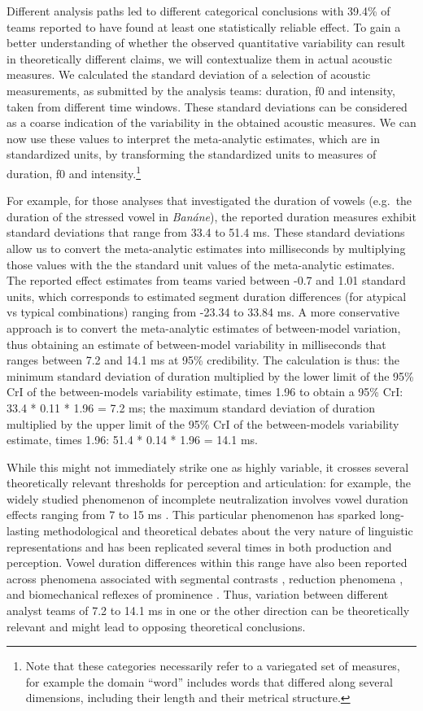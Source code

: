 \documentclass[Review,times,sageh]{sagej}
\begin{document}
Different analysis paths led to different categorical conclusions with 39.4\% of teams reported to have found at least one statistically reliable effect.
To gain a better understanding of whether the observed quantitative variability can result in theoretically different claims, we will contextualize them in actual acoustic measures.
We calculated the standard deviation of a selection of acoustic measurements, as submitted by the analysis teams: duration, f0 and intensity, taken from different time windows.
These standard deviations can be considered as a coarse indication of the variability in the obtained acoustic measures.
We can now use these values to interpret the meta-analytic estimates, which are in standardized units, by transforming the standardized units to measures of duration, f0 and intensity.\footnote{Note that these categories necessarily refer to a variegated set of measures, for example the domain ``word'' includes words that differed along several dimensions, including their length and their metrical structure.}

For example, for those analyses that investigated the duration of vowels (e.g.~the duration of the stressed vowel in \emph{Banáne}), the reported duration measures exhibit standard deviations that range from 33.4 to 51.4 ms.
These standard deviations allow us to convert the meta-analytic estimates into milliseconds by multiplying those values with the the standard unit values of the meta-analytic estimates.
The reported effect estimates from teams varied between -0.7 and 1.01 standard units, which corresponds to estimated segment duration differences (for atypical vs typical combinations) ranging from -23.34 to 33.84 ms.
A more conservative approach is to convert the meta-analytic estimates of between-model variation, thus obtaining an estimate of between-model variability in milliseconds that ranges between 7.2 and 14.1 ms at 95\% credibility.
The calculation is thus: the minimum standard deviation of duration multiplied by the lower limit of the 95\% CrI of the between-models variability estimate, times 1.96 to obtain a 95\% CrI: 33.4 * 0.11 * 1.96 = 7.2 ms; the maximum standard deviation of duration multiplied by the upper limit of the 95\% CrI of the between-models variability estimate, times 1.96: 51.4 * 0.14 * 1.96 = 14.1 ms.

While this might not immediately strike one as highly variable, it crosses several theoretically relevant thresholds for perception and articulation:
for example, the widely studied phenomenon of incomplete neutralization involves vowel duration effects ranging from 7 to 15 ms \citep{nicenboim2018using}.
This particular phenomenon has sparked long-lasting methodological and theoretical debates about the very nature of linguistic representations \citep{port2005against} and has been replicated several times in both production and perception.
Vowel duration differences within this range have also been reported across phenomena associated with segmental contrasts \citep{coretta2019}, reduction phenomena \citep{nowak2006}, and biomechanical reflexes of prominence \citep{mucke2014effect}.
Thus, variation between different analyst teams of 7.2 to 14.1 ms in one or the other direction can be theoretically relevant and might lead to opposing theoretical conclusions.
\end{document}
